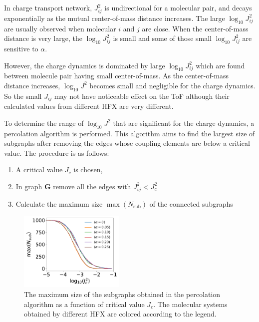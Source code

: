 \documentclass[%
 reprint,
superscriptaddress,
 amsmath,amssymb,
 aps,
prb,
floatfix
]{revtex4-2}
\begin{document}
In charge transport network, $J_{ij}^2$ is undirectional for a molecular pair, and decays exponentially as the mutual center-of-mass distance increases. The large $\log_{10} J_{ij}^2$ are usually observed when molecular $i$ and $j$ are close.
When the center-of-mass distance is very large, the $\log_{10} J_{ij}^2$ is small and some of those small $\log_{10} J_{ij}^2$ are sensitive to $\alpha$. 

However, the charge dynamics is dominated by large $\log_{10} J_{ij}^2$ which are found between molecule pair having small center-of-mass. As the center-of-mass distance increases, $\log_{10} J^2$ becomes small and negligible for the charge dynamics. So the small $J_{ij}$ may not have noticeable effect on the ToF although their calculated values from different HFX are very different. 

To determine the range of $\log_{10} J^2$ that are significant for the charge dynamics, a percolation algorithm is performed. This algorithm aims to find the largest size of subgraphs after removing the edges whose coupling elements are below a critical value. The procedure is as follows:
\begin{enumerate}
    \item A critical value $J_c$ is chosen,
    \item In graph $\mathbf{G}$ remove all the edges with $J_{ij}^2 < J_c^2$
    \item Calculate the maximum size $\max({N_\text{sub}})$ of the connected subgraphs
\end{enumerate}

\begin{figure}[btp]
  \centering
  \includegraphics[width=0.45\textwidth]{figs/fig_network_all.pdf}
  \caption{The maximum size of the subgraphs obtained in the percolation algorithm as a function of critical value $J_c$. The molecular systems obtained by different HFX are colored according to the legend.}
  \label{fig:J_percolate}
\end{figure}
\end{document}
